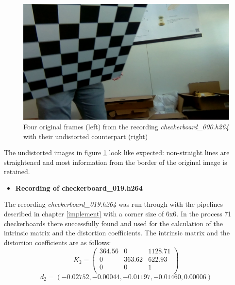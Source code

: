 \begin{figure}[H]
\begin{minipage}[t]{0.24\textwidth}
     \end{minipage}%
     \begin{minipage}[t]{0.24\textwidth}
        \centering
        \includegraphics[width=.95\textwidth]{image/3/rec_1/1379_undist.png}
     \end{minipage}
     
     \caption{Four original frames (left) from the recording \textit{checkerboard\_000.h264} with their undistorted counterpart (right)}
    \label{fig:rec_000}
\end{figure}

The undistorted images in figure \ref{fig:rec_000} look like expected: non-straight lines are straightened and most information from the border of the original image is retained. 

\begin{itemize}[leftmargin=*]
    \item \textbf{\large Recording of checkerboard\_019.h264}
\end{itemize}

The recording \textit{checkerboard\_019.h264} was run through with the pipelines described in chapter \ref{implement} with a corner size of 6x6. In the process 71 checkerboards there successfully found and used for the calculation of the intrinsic matrix and the distortion coefficients. The intrinsic matrix and the distortion coefficients are as follows:
\newpage
\begin{equation*}
    K_2 = 
    \begin{pmatrix}
        364.56 & 0 & 1128.71\\
        0 & 363.62 & 622.93\\
        0 & 0 & 1\\
    \end{pmatrix}
\end{equation*}
\vspace{1mm}
\begin{equation*}
    d_2 = (-0.02752, -0.00044, -0.01197, -0.01460, 0.00006)
\end{equation*}

